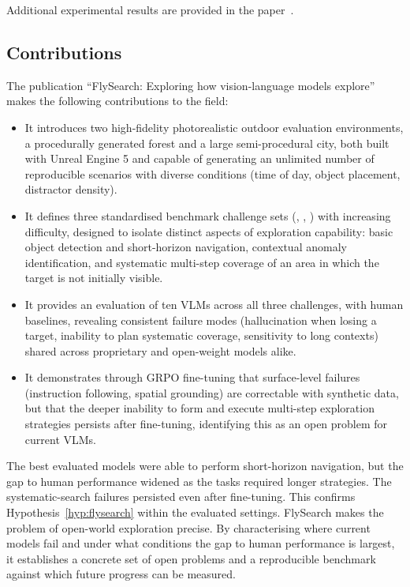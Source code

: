 Additional experimental results are provided in the paper~.

\subsection{Contributions}
\label{sec:contributions-flysearch}

The publication ``FlySearch: Exploring how vision-language models explore''~ makes the following contributions to the field:

\begin{itemize}
    \item It introduces two high-fidelity photorealistic outdoor evaluation environments, a procedurally generated forest and a large semi-procedural city, both built with Unreal Engine 5 and capable of generating an unlimited number of reproducible scenarios with diverse conditions (time of day, object placement, distractor density).
    \item It defines three standardised benchmark challenge sets (\challenge{}, \anomalychallenge{}, \hardchallenge{}) with increasing difficulty, designed to isolate distinct aspects of exploration capability: basic object detection and short-horizon navigation, contextual anomaly identification, and systematic multi-step coverage of an area in which the target is not initially visible.
    \item It provides an evaluation of ten VLMs across all three challenges, with human baselines, revealing consistent failure modes (hallucination when losing a target, inability to plan systematic coverage, sensitivity to long contexts) shared across proprietary and open-weight models alike.
    \item It demonstrates through GRPO fine-tuning that surface-level failures (instruction following, spatial grounding) are correctable with synthetic data, but that the deeper inability to form and execute multi-step exploration strategies persists after fine-tuning, identifying this as an open problem for current VLMs.
\end{itemize}

The best evaluated models were able to perform short-horizon navigation, but the gap to human performance widened as the tasks required longer strategies. The systematic-search failures persisted even after fine-tuning. This confirms Hypothesis~\ref{hyp:flysearch} within the evaluated settings. FlySearch makes the problem of open-world exploration precise. By characterising where current models fail and under what conditions the gap to human performance is largest, it establishes a concrete set of open problems and a reproducible benchmark against which future progress can be measured.

